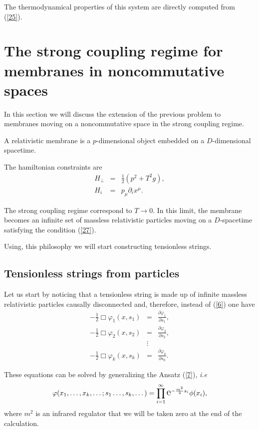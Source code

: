 \documentclass[a4paper,aps,twocolumn,amsfonts]{revtex4}
\begin{document}
   The thermodynamical properties of this system are directly computed from (\ref{25}).

   \section{The strong coupling regime for membranes in noncommutative spaces}

   In this section we will discuss the extension  of the previous problem to membranes moving on a noncommutative space in the strong coupling regime.

   A relativistic membrane is a $p$-dimensional object embedded on a $D$-dimensional spacetime.

   The hamiltonian constraints are
   \begin{eqnarray}
   H_{\perp}&=&\frac{1}{2}(p^2 + T^2 g),\label{26}
   \\
   H_i&=&p_\mu\partial _i x^\mu.\label{27}
   \end{eqnarray}

   The strong coupling regime correspond to $T\rightarrow 0$. In this limit, the membrane becomes an infinite set of massless relativistic particles moving on a $D$-spacetime satisfying the condition (\ref{27}).

   Using, this philosophy we will start constructing tensionless strings.

   \subsection{Tensionless strings from particles}

   Let us start by noticing that a tensionless string \cite{gamboa} is made up of infinite massless relativistic particles causally disconnected and, therefore, instead of (\ref{6}) one have
   \begin{eqnarray}
   -\frac{1}{2}\Box \varphi_1 (x, s_1)&=& \frac{\partial
   \varphi_1}{\partial s_1},\nonumber
   \\
   -\frac{1}{2}\Box \varphi_2 (x, s_2) &=&  \frac{\partial
   \varphi_2}{\partial s_2},\nonumber
   \\
   &\vdots& \nonumber
   \\
   -\frac{1}{2}\Box \varphi_k (x, s_k) &=&  \frac{\partial
   \varphi_k}{\partial s_k}.
   \end{eqnarray}

   These equations can be solved  by generalizing the Ansatz (\ref{7}), {\it i.e}
   \begin{equation}
   \varphi(x_1,\dots,x_k,\dots;s_1\dots,s_k,\dots)=\prod
   _{i=1}^{\infty}\text{\Large e}^{-\frac{m^2}{2}s_i}\phi(x_i),
   \end{equation}
where $m^2$ is an infrared regulator that we will be taken zero at the end of the calculation.
\end{document}
